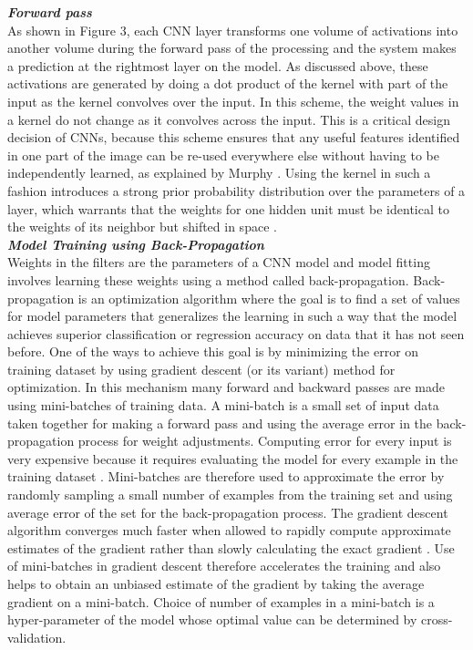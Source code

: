 \documentclass [11pt,letterpaper ,openany ]{report}
\begin{document}
    \noindent
    \textbf{\textit{Forward pass}}\\
    As shown in Figure 3, each CNN layer transforms one volume of activations into another volume during the forward pass of the processing and the system makes a prediction at the rightmost layer on the model. As discussed above, these activations are generated by doing a dot product of the kernel with part of the input as the kernel convolves over the input. In this scheme, the weight values in a kernel do not change as it convolves across the input. This is a critical design decision of CNNs, because this scheme ensures that any useful features identified in one part of the image can be re-used everywhere else without having to be independently learned, as explained by Murphy \cite{Murphy2012}. Using the kernel in such a fashion introduces a strong prior probability distribution over the parameters of a layer, which warrants that the weights for one hidden unit must be identical to the weights of its neighbor but shifted in space \cite{Goodfellow-et-al-2016}.\\

    \noindent
    \textbf{\textit{Model Training using Back-Propagation}} \\
    Weights in the filters are the parameters of a CNN model and model fitting involves learning these weights using a method called back-propagation. Back-propagation is an optimization algorithm where the goal is to find a set of values for model parameters that generalizes the learning in such a way that the model achieves superior classification or regression accuracy on data that it has not seen before. One of the ways to achieve this goal is by minimizing the error on training dataset by using gradient descent (or its variant) method for optimization. In this mechanism many forward and backward passes are made using mini-batches of training data. A mini-batch is a small set of input data taken together for making a forward pass and using the average error in the back-propagation process for weight adjustments. Computing error for every input is very expensive because it requires evaluating the model for every example in the training dataset \cite{Goodfellow-et-al-2016}. Mini-batches are therefore used to approximate the error by randomly sampling a small number of examples from the training set and using average error of the set for the back-propagation process. The gradient descent algorithm converges much faster when allowed to rapidly compute approximate estimates of the gradient rather than slowly calculating the exact gradient \cite{Goodfellow-et-al-2016}. Use of mini-batches in gradient descent therefore accelerates the training and also helps to obtain an unbiased estimate of the gradient by taking the average gradient on a mini-batch. Choice of number of examples in a mini-batch is a hyper-parameter of the model whose optimal value can be determined by cross-validation.
\end{document}
